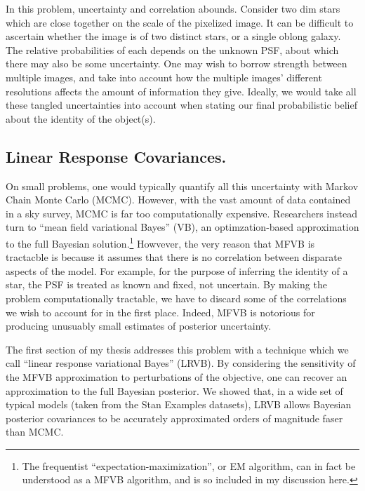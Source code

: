 In this problem, uncertainty and correlation abounds.  Consider two dim stars
which are close together on the scale of the pixelized image.  It can be
difficult to ascertain whether the image is of two distinct stars, or a single
oblong galaxy.  The relative probabilities of each depends on the unknown PSF,
about which there may also be some uncertainty.  One may wish to borrow
strength between multiple images, and take into account how the multiple
images' different resolutions affects the amount of information they give.
Ideally, we would take all these tangled uncertainties into account when stating
our final probabilistic belief about the identity of the object(s).

\subsection*{Linear Response Covariances.}

On small problems, one would typically quantify all this uncertainty with Markov
Chain Monte Carlo (MCMC).  However, with the vast amount of data contained in a
sky survey, MCMC is far too computationally expensive.  Researchers instead turn
to ``mean field variational Bayes'' (VB), an optimzation-based approximation to
the full Bayesian solution.\footnote{ The frequentist
``expectation-maximization'', or EM algorithm, can in fact be understood as a
MFVB algorithm, and is so included in my discussion here.} Howvever, the very
reason that MFVB is tractacble is because it assumes that there is no
correlation between disparate aspects of the model.  For example, for the
purpose of inferring the identity of a star, the PSF is treated as known and
fixed, not uncertain.  By making the problem computationally tractable, we have
to discard some of the correlations we wish to account for in the first place.
Indeed, MFVB is notorious for producing unusuably small estimates of posterior
uncertainty.

The first section of my thesis addresses this problem with a technique which we
call ``linear response variational Bayes'' (LRVB).  By considering the
sensitivity of the MFVB approximation to perturbations of the objective, one can
recover an approximation to the full Bayesian posterior.  We showed that, in a
wide set of typical models (taken from the Stan Examples datasets), LRVB allows
Bayesian posterior covariances to be accurately approximated orders of magnitude
faser than MCMC.

